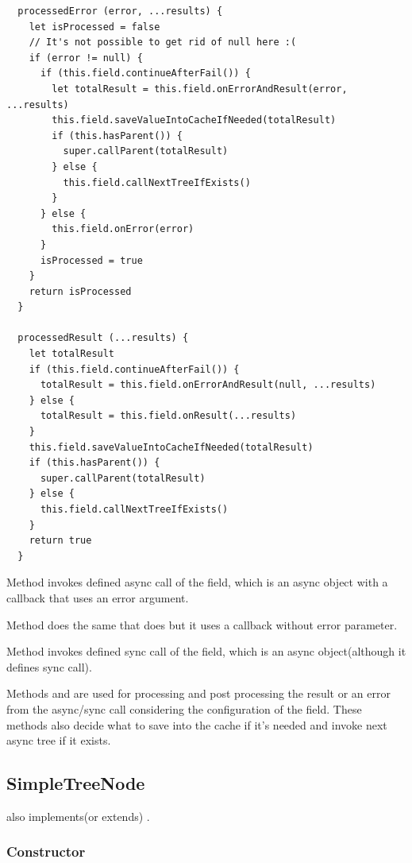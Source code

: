 \documentclass{article}
\begin{document}
\begin{verbatim}
  processedError (error, ...results) {
    let isProcessed = false
    // It's not possible to get rid of null here :(
    if (error != null) {
      if (this.field.continueAfterFail()) {
        let totalResult = this.field.onErrorAndResult(error, ...results)
        this.field.saveValueIntoCacheIfNeeded(totalResult)
        if (this.hasParent()) {
          super.callParent(totalResult)
        } else {
          this.field.callNextTreeIfExists()
        }
      } else {
        this.field.onError(error)
      }
      isProcessed = true
    }
    return isProcessed
  }

  processedResult (...results) {
    let totalResult
    if (this.field.continueAfterFail()) {
      totalResult = this.field.onErrorAndResult(null, ...results)
    } else {
      totalResult = this.field.onResult(...results)
    }
    this.field.saveValueIntoCacheIfNeeded(totalResult)
    if (this.hasParent()) {
      super.callParent(totalResult)
    } else {
      this.field.callNextTreeIfExists()
    }
    return true
  }
\end{verbatim}

Method  invokes defined async call of the field, which is an async object with a callback that uses an error argument.

Method  does the same that  does but it uses a callback without error parameter.

Method  invokes defined sync call of the field, which is an async object(although it defines sync call).

Methods  and  are used for processing and post processing the result or an error from the async/sync call considering the configuration of the field. These methods also decide what to save into the cache if it's needed and invoke next async tree if it exists.

\vspace*{10px}

\subsection{SimpleTreeNode}

 also implements(or extends) .

\subsubsection{Constructor}
\end{document}
